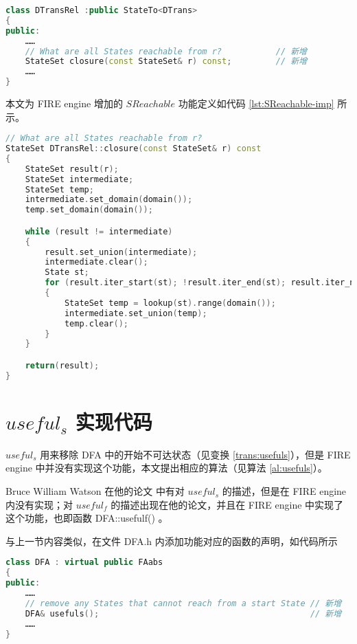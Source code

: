 \lstset{style=mystyle}
\begin{lstlisting}[language=C++,label={lst:SReachable-def},caption={文件 DTransRel.h}]
class DTransRel :public StateTo<DTrans>
{
public:
    ……
    // What are all States reachable from r?           // 新增
    StateSet closure(const StateSet& r) const;         // 新增
    ……
}
\end{lstlisting}

本文为 FIRE engine 增加的 $SReachable$ 功能定义如代码 \ref{lst:SReachable-imp} 所示。

\lstset{style=mystyle}
\begin{lstlisting}[language=C++,label={lst:SReachable-imp},caption={文件 DTransRel.cpp}]
// What are all States reachable from r?
StateSet DTransRel::closure(const StateSet& r) const
{
    StateSet result(r);
    StateSet intermediate;
    StateSet temp;
    intermediate.set_domain(domain());
    temp.set_domain(domain());

    while (result != intermediate)
    {
        result.set_union(intermediate);
        intermediate.clear();
        State st;
        for (result.iter_start(st); !result.iter_end(st); result.iter_next(st))
        {
            StateSet temp = lookup(st).range(domain());
            intermediate.set_union(temp);
            temp.clear();
        }
    }

    return(result);
}
\end{lstlisting}

\section{$useful_s$ 实现代码}\label{sec:usefulfs-imp}

$useful_s$ 用来移除 DFA 中的开始不可达状态（见变换 \ref{trans:usefuls}），但是 FIRE engine 中并没有实现这个功能，本文提出相应的算法（见算法 \ref{al:usefuls}）。

\begin{remark}
    Bruce William Watson 在他的论文 \cite{watson1993taxonomyb} 中有对 $useful_s$ 的描述，但是在 FIRE engine 内没有实现；对 $useful_f$ 的描述出现在他的论文\cite[注释 2.39]{watson1993taxonomya}，并且在 FIRE engine 中实现了这个功能，也即函数 DFA::usefulf() 。
\end{remark}

与上一节内容类似，在文件 DFA.h 内添加功能对应的函数的声明，如代码所示

\begin{lstlisting}[language=C++,label={lst:usefuls-def},caption={文件 DFA.h}]
class DFA : virtual public FAabs
{
public:
    ……
    // remove any States that cannot reach from a start State // 新增
	DFA& usefuls();                                           // 新增
    ……
}
\end{lstlisting}

